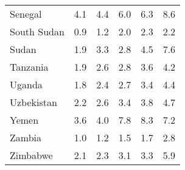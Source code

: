 \begin{table}[b]
\begin{tabular}[t]{lrrrrr}
Senegal & 4.1 & 4.4 & 6.0 & 6.3 & 8.6\\
South Sudan & 0.9 & 1.2 & 2.0 & 2.3 & 2.2\\
Sudan & 1.9 & 3.3 & 2.8 & 4.5 & 7.6\\
Tanzania & 1.9 & 2.6 & 2.8 & 3.6 & 4.2\\
Uganda & 1.8 & 2.4 & 2.7 & 3.4 & 4.4\\
Uzbekistan & 2.2 & 2.6 & 3.4 & 3.8 & 4.7\\
Yemen & 3.6 & 4.0 & 7.8 & 8.3 & 7.2\\
Zambia & 1.0 & 1.2 & 1.5 & 1.7 & 2.8\\
Zimbabwe & 2.1 & 2.3 & 3.1 & 3.3 & 5.9\\
\bottomrule
\end{tabular}
\end{table}